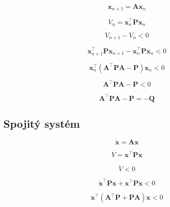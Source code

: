 \documentclass[a4paper, 10pt, ]{article}
\begin{document}
\begin{equation}
    \bm{x}_{n + 1} = \bm{A} \bm{x}_{n}
\end{equation}

\begin{equation}
    V_{n} = \bm{x}_{n}^\top \bm{P} \bm{x}_{n}
\end{equation}

\begin{equation}
    V_{n + 1} - V_{n} < 0
\end{equation}

\begin{equation}
    \bm{x}_{n + 1}^\top \bm{P} \bm{x}_{n + 1} - \bm{x}_{n}^\top \bm{P} \bm{x}_{n} < 0
\end{equation}

\begin{equation}
    \bm{x}_{n}^\top \left( \bm{A}^\top \bm{P} \bm{A} - \bm{P} \right) \bm{x}_{n} < 0
\end{equation}

\begin{equation}
    \bm{A}^\top \bm{P} \bm{A} - \bm{P} < 0
\end{equation}

\begin{equation}
    \bm{A}^\top \bm{P} \bm{A} - \bm{P} = -\bm{Q}
\end{equation}


\subsection{Spojitý systém}

\begin{equation}
    \dot{\bm{x}} = \bm{A} \bm{x}
\end{equation}

\begin{equation}
    V = \bm{x}^\top \bm{P} \bm{x}
\end{equation}

\begin{equation}
    \dot{V} < 0
\end{equation}

\begin{equation}
    \dot{\bm{x}}^\top \bm{P} \bm{x} + \bm{x}^\top \bm{P} \dot{\bm{x}} < 0
\end{equation}

\begin{equation}
    \bm{x}^\top \left( \bm{A}^\top \bm{P} + \bm{P} \bm{A} \right) \bm{x} < 0
\end{equation}
\end{document}
